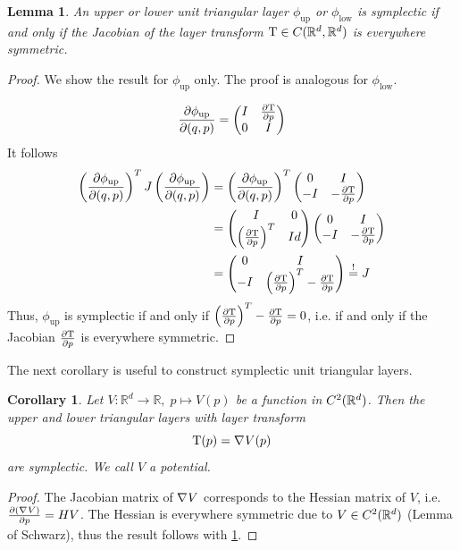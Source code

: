 \documentclass[twoside,a4paper]{article}
\newtheorem{corollary}{Corollary}
\newtheorem{lemma}{Lemma}
\begin{document}
\begin{lemma}\label{jacobi_symmetric}
	An upper or lower unit triangular layer $\phi_{\text{up}}$ or $\phi_{\text{low}}$
	is symplectic if and only if the Jacobian of the layer transform
	$\mathrm{T} \in C(\mathbb{R}^d, \mathbb{R}^d)$ 
	is everywhere symmetric.
\end{lemma}
\begin{proof}
	We show the result for $\phi_{\text{up}}$ only. 
	The proof is analogous for $\phi_{\text{low}}$.

	\begin{equation*}
		\frac{\partial \phi_{\text{up}}}{\partial (q,p)} = \begin{pmatrix}
			I & \frac{\partial \mathrm{T}}{\partial p} \\
			0 & I
		\end{pmatrix}
	\end{equation*}
	It follows
	\begin{align*}
		\left( \frac{\partial \phi_{\text{up}}}{\partial (q,p)} \right)^T J \left( \frac{\partial \phi_{\text{up}}}{\partial (q,p)} \right)
		&= \left( \frac{\partial \phi_{\text{up}}}{\partial (q,p)} \right)^T \begin{pmatrix}
			0 & I \\
			-I & -\frac{\partial \mathrm{T}}{\partial p}
		\end{pmatrix} \\
		&= \begin{pmatrix}
			I & 0 \\
			\left( \frac{\partial \mathrm{T}}{\partial p} \right)^T & Id
		\end{pmatrix} \begin{pmatrix}
			0 & I \\
			-I & -\frac{\partial \mathrm{T}}{\partial p}
		\end{pmatrix} \\
		&= \begin{pmatrix}
			0 & I \\
			-I & \left( \frac{\partial \mathrm{T}}{\partial p} \right) ^T-\frac{\partial \mathrm{T}}{\partial p}
		\end{pmatrix} \overset{!}{=} J
	\end{align*}
	Thus, $\phi_{\text{up}}$ is symplectic if and only if
	$\left( \frac{\partial \mathrm{T}}{\partial p} \right) ^T-\frac{\partial \mathrm{T}}{\partial p}=0$, 
	i.e. if and only if the Jacobian $\frac{\partial \mathrm{T}}{\partial p}$ is everywhere symmetric.
\end{proof}

The next corollary is useful to construct symplectic unit triangular layers.
\begin{corollary}\label{gradient_corollary}
	Let $V: \mathbb{R}^d \to \mathbb{R}, \; p \mapsto V(p)$ be a function in 
	$C^2(\mathbb{R}^d)$. Then the upper and lower triangular layers with layer transform
	\begin{equation*}
		\mathrm{T}(p) = \nabla_{}{V}(p)
	\end{equation*}
	are symplectic. We call $V$ a potential.
\end{corollary}
\begin{proof}
	The Jacobian matrix of $\nabla_{}{V}$ corresponds to the Hessian matrix of $V$,
	i.e. $\frac{\partial (\nabla_{}{V})}{\partial p} = HV$. 
	The Hessian is everywhere symmetric due to $V \in C^2(\mathbb{R}^d)$ (Lemma of Schwarz),
	thus the result follows with \cref{jacobi_symmetric}.
\end{proof}
\end{document}
